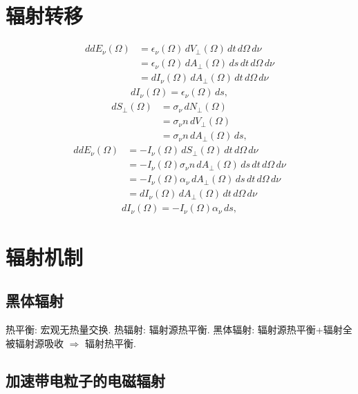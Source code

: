 \section{辐射转移}

\begin{align}
    ddE_\nu(\Omega)&=\epsilon_\nu(\Omega)\,dV_\perp(\Omega)\,dt\,d\Omega\,d\nu\\
    &=\epsilon_\nu(\Omega)\,dA_\perp(\Omega)\,ds\,dt\,d\Omega\,d\nu\\
    &=dI_\nu(\Omega)\,dA_\perp(\Omega)\,dt\,d\Omega\,d\nu
\end{align}
\begin{align}
    dI_\nu(\Omega)=\epsilon_\nu(\Omega)\,ds,
\end{align}
\begin{align}
    dS_\perp(\Omega)&=\sigma_\nu\,dN_\perp(\Omega)\\
    &=\sigma_\nu n\,dV_\perp(\Omega)\\
    &=\sigma_\nu n\,dA_\perp(\Omega)\,ds,
\end{align}
\begin{align}
    ddE_\nu(\Omega)&=-I_\nu(\Omega)\,dS_\perp(\Omega)\,dt\,d\Omega\,d\nu\\
    &=-I_\nu(\Omega)\sigma_\nu n\,dA_\perp(\Omega)\,ds\,dt\,d\Omega\,d\nu\\
    &=-I_\nu(\Omega)\alpha_\nu\,dA_\perp(\Omega)\,ds\,dt\,d\Omega\,d\nu\\
    &=dI_\nu(\Omega)\,dA_\perp(\Omega)\,dt\,d\Omega\,d\nu
\end{align}
\begin{align}
    dI_\nu(\Omega)=-I_\nu(\Omega)\alpha_\nu\,ds,
\end{align}

\section{辐射机制}

\subsection{黑体辐射}

热平衡: 宏观无热量交换. 热辐射: 辐射源热平衡. 黑体辐射: 辐射源热平衡+辐射全被辐射源吸收 $\Rightarrow$ 辐射热平衡.

\subsection{加速带电粒子的电磁辐射}

